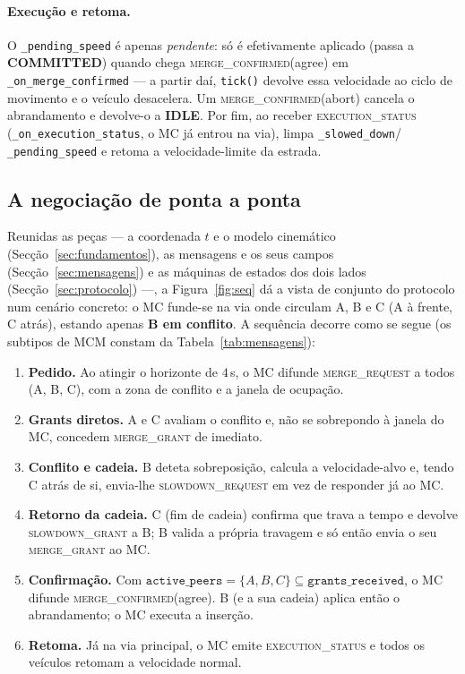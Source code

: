 \documentclass[11pt,a4paper]{article}
\begin{document}
\paragraph{Execução e retoma.} O \texttt{\_pending\_speed} é apenas \emph{pendente}: só é
efetivamente aplicado (passa a \textbf{COMMITTED}) quando chega \textsc{merge\_confirmed}(agree)
em \texttt{\_on\_merge\_confirmed} --- a partir daí, \texttt{tick()} devolve essa velocidade
ao ciclo de movimento e o veículo desacelera. Um \textsc{merge\_confirmed}(abort) cancela o
abrandamento e devolve-o a \textbf{IDLE}. Por fim, ao receber \textsc{execution\_status}
(\texttt{\_on\_execution\_status}, o MC já entrou na via), limpa \texttt{\_slowed\_down}/%
\texttt{\_pending\_speed} e retoma a velocidade-limite da estrada.

\subsection{A negociação de ponta a ponta}
\label{sec:negociacao}

Reunidas as peças --- a coordenada $t$ e o modelo cinemático
(Secção~\ref{sec:fundamentos}), as mensagens e os seus campos (Secção~\ref{sec:mensagens})
e as máquinas de estados dos dois lados (Secção~\ref{sec:protocolo}) ---, a
Figura~\ref{fig:seq} dá a vista de conjunto do protocolo num cenário concreto: o MC
funde-se na via onde circulam A, B e C (A à frente, C atrás), estando apenas \textbf{B em
conflito}. A sequência decorre como se segue (os subtipos de MCM constam da
Tabela~\ref{tab:mensagens}):

\begin{enumerate}[noitemsep,topsep=2pt,label=\arabic*.]
  \item \textbf{Pedido.} Ao atingir o horizonte de $4$\,s, o MC difunde \textsc{merge\_request}
        a todos (A, B, C), com a zona de conflito e a janela de ocupação.
  \item \textbf{Grants diretos.} A e C avaliam o conflito e, não se sobrepondo à janela do
        MC, concedem \textsc{merge\_grant} de imediato.
  \item \textbf{Conflito e cadeia.} B deteta sobreposição, calcula a velocidade-alvo e,
        tendo C atrás de si, envia-lhe \textsc{slowdown\_request} em vez de responder já ao
        MC.
  \item \textbf{Retorno da cadeia.} C (fim de cadeia) confirma que trava a tempo e devolve
        \textsc{slowdown\_grant} a B; B valida a própria travagem e só então envia o seu
        \textsc{merge\_grant} ao MC.
  \item \textbf{Confirmação.} Com $\texttt{active\_peers}=\{A,B,C\}\subseteq\texttt{grants\_received}$,
        o MC difunde \textsc{merge\_confirmed}(agree). B (e a sua cadeia) aplica então o
        abrandamento; o MC executa a inserção.
  \item \textbf{Retoma.} Já na via principal, o MC emite \textsc{execution\_status} e todos
        os veículos retomam a velocidade normal.
\end{enumerate}
\end{document}
